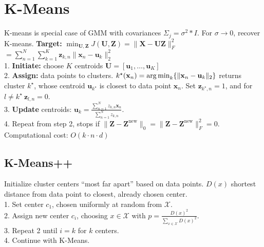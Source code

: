 \section{K-Means}
K-means is special case of GMM with covariances $\Sigma_j = \sigma^2 * I$. For $\sigma \rightarrow 0$, recover K-means.
\textbf{Target:} $\min_{\mathbf{U}, \mathbf{Z}} J(\mathbf{U}, \mathbf{Z}) = \|\mathbf{X} - \mathbf{U} \mathbf{Z}\|_F^2$\\
$= \sum_{n=1}^N \sum_{k=1}^K \mathbf{z}_{k,n} \|\mathbf{x}_n - \mathbf{u}_k\|_2^2$\\
1. \textbf{Initiate:} choose $K$ centroids $\mathbf{U} = [\mathbf{u}_1, \ldots, \mathbf{u}_K]$\\
2. \textbf{Assign:} data points to clusters. $k^\star(\mathbf{x}_n) = \operatorname*{arg\,min}_k \{ \|\mathbf{x}_n - \mathbf{u}_k\|_2 \}$ returns cluster $k^\star$, whose centroid $\mathbf{u}_{k^\star}$ is closest to data point $\mathbf{x}_n$. Set $\mathbf{z}_{k^\star,n} = 1$, and for $ l \neq k^\star~ \mathbf{z}_{l,n}=0$.\\
3. \textbf{Update} centroids: $\mathbf{u}_k = \frac{\sum_{n=1}^N z_{k,n} \mathbf{x}_n}{\sum_{n=1}^N z_{k,n}}$.\\
4. Repeat from step 2, stops if $\|\mathbf{Z} - \mathbf{Z}^\text{new}\|_0 = \|\mathbf{Z} - \mathbf{Z}^\text{new}\|^2_F = 0$.\\
Computational cost: $O(k\cdot n \cdot d)$

\subsection{K-Means++}
Initialize cluster centers ``most far apart'' based on data points. $D(x)$ shortest distance from data point to closest, already chosen center.\\
1. Set center $c_1$, chosen uniformly at random from $\mathcal{X}$.\\
2. Assign new center $c_i$, choosing $x \in \mathcal{X}$ with $p = \tfrac{D(x)^2}{\sum_{x \in \mathcal{X}} D(x)^2}$.\\
3. Repeat 2 until $i = k$ for $k$ centers.\\
4. Continue with K-Means.